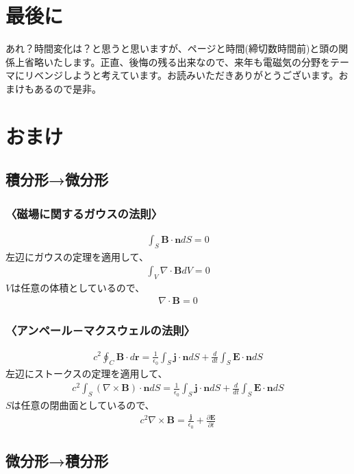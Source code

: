 \documentclass[10pt,b5paper,papersize,dvipdfmx]{jsbook}
\begin{document}
\section{最後に}
あれ？時間変化は？と思うと思いますが、ページと時間(締切数時間前)と頭の関係上省略いたします。正直、後悔の残る出来なので、来年も電磁気の分野をテーマにリベンジしようと考えています。お読みいただきありがとうございます。おまけもあるので是非。

\section{おまけ}
\subsection{積分形→微分形}
\subsubsection{〈磁場に関するガウスの法則〉}
\begin{align}
\int_S \mathbf{B}\cdot \mathbf{n}dS = 0
\end{align}
左辺にガウスの定理を適用して、
\begin{align}
\int_V \nabla\cdot\mathbf{B}dV = 0
\end{align}
$V$は任意の体積としているので、
\begin{align}
\nabla\cdot\mathbf{B}=0
\end{align}

\subsubsection{〈アンペール－マクスウェルの法則〉}
\begin{align}
c^2 \oint_C \mathbf{B}\cdot d\mathbf{r} = \frac{1}{\epsilon_0}\int_S \mathbf{j}\cdot \mathbf{n}dS + \frac{d}{dt}\int_S \mathbf{E}\cdot \mathbf{n}dS
\end{align}
左辺にストークスの定理を適用して、
\begin{align}
c^2 \int_S (\nabla\times\mathbf{B})\cdot\mathbf{n}dS = \frac{1}{\epsilon_0}\int_S \mathbf{j}\cdot \mathbf{n}dS + \frac{d}{dt}\int_S \mathbf{E}\cdot \mathbf{n}dS
\end{align}
$S$は任意の閉曲面としているので、
\begin{align}
c^2 \nabla\times\mathbf{B} = \frac{\mathbf{j}}{\epsilon_0} + \frac{\partial\mathbf{E}}{\partial t}
\end{align}

\subsection{微分形→積分形}
\end{document}
